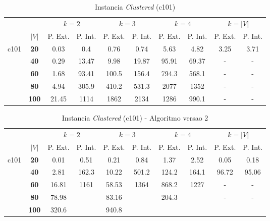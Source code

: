 \documentclass[12pt]{article}
\begin{document}
\begin{table}[!htb]
\centering
\small
\begin{tabular}{|c|c|c|c|c|c|c|c|c|c|}
\cline{3-10}
\multicolumn{2}{c}{} & \multicolumn{2}{|c}{$k=2$} & \multicolumn{2}{|c|}{$k=3$} & \multicolumn{2}{c|}{$k=4$} & \multicolumn{2}{c|}{$k=|V|$}\\
\cline{2-10}
\multicolumn{1}{c}{} & \multicolumn{1}{|c|}{$|V|$} & \multicolumn{1}{|c|}{P. Ext.} & \multicolumn{1}{|c|}{P. Int.} & \multicolumn{1}{|c|}{P. Ext.} & \multicolumn{1}{|c|}{P. Int.} & \multicolumn{1}{|c|}{P. Ext.} & \multicolumn{1}{|c|}{P. Int.} & \multicolumn{1}{|c|}{P. Ext.} & \multicolumn{1}{|c|}{P. Int.} \\
\hline
\multirow{5}{*}{c101} & \textbf{20} & 0.03 & 0.4 & 0.76 & 0.74 & 5.63 & 4.82 & 3.25 & 3.71 \\
\cline{2-10}
 & \textbf{40} & 0.29 & 13.47 & 9.98 & 19.87 & 95.91 & 69.37 & - & - \\
\cline{2-10}
& \textbf{60} & 1.68 & 93.41 & 100.5 & 156.4 & 794.3 & 568.1 & - & - \\
\cline{2-10}
& \textbf{80} & 4.94 & 305.9 & 410.2 & 531.3 & 2077 & 1352 & - & - \\
\cline{2-10}
& \textbf{100} & 21.45 & 1114 & 1862 & 2134 & 1286 & 990.1 & - & - \\ 
\hline
\end{tabular}
\caption{Instancia \emph{Clustered} (c101)}
\end{table}

\vspace{1cm}

\begin{table}[!htb]
\centering
\small
\begin{tabular}{|c|c|c|c|c|c|c|c|c|c|}
\cline{3-10}
\multicolumn{2}{c}{} & \multicolumn{2}{|c}{$k=2$} & \multicolumn{2}{|c|}{$k=3$} & \multicolumn{2}{c|}{$k=4$} & \multicolumn{2}{c|}{$k=|V|$}\\
\cline{2-10}
\multicolumn{1}{c}{} & \multicolumn{1}{|c|}{$|V|$} & \multicolumn{1}{|c|}{P. Ext.} & \multicolumn{1}{|c|}{P. Int.} & \multicolumn{1}{|c|}{P. Ext.} & \multicolumn{1}{|c|}{P. Int.} & \multicolumn{1}{|c|}{P. Ext.} & \multicolumn{1}{|c|}{P. Int.} & \multicolumn{1}{|c|}{P. Ext.} & \multicolumn{1}{|c|}{P. Int.} \\
\hline
\multirow{5}{*}{c101} & \textbf{20} & 0.01 & 0.51 & 0.21 & 0.84 & 1.37 & 2.52 & 0.05 & 0.18 \\
\cline{2-10}
 & \textbf{40} & 2.81 & 162.3 & 10.22 & 501.2 & 124.2 & 164.1 & 96.72 & 95.06 \\
\cline{2-10}
& \textbf{60} & 16.81 & 1161 & 58.53 & 1364 & 868.2 & 1227 & - & - \\
\cline{2-10}
& \textbf{80} & 78.98 &  & 83.16 &  & 204.3 &  & - &  - \\
\cline{2-10}
& \textbf{100} & 320.6 &  & 940.8 &  &  &  &  &  \\
\hline
\end{tabular}
\caption{Instancia \emph{Clustered} (c101) - Algoritmo versao 2}
\end{table}
\end{document}
